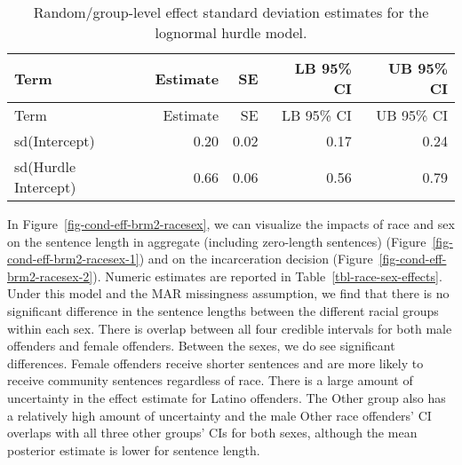 \documentclass[
  letterpaper,
  DIV=11,
  numbers=noendperiod]{scrartcl}
\begin{document}
\hypertarget{tbl-brms2-re}{}
\begin{longtable}[]{@{}lrrrr@{}}
\caption{\label{tbl-brms2-re}Random/group-level effect standard
deviation estimates for the lognormal hurdle model.}\tabularnewline
\toprule\noalign{}
Term & Estimate & SE & LB 95\% CI & UB 95\% CI \\
\midrule\noalign{}
\endfirsthead
\toprule\noalign{}
Term & Estimate & SE & LB 95\% CI & UB 95\% CI \\
\midrule\noalign{}
\endhead
\bottomrule\noalign{}
\endlastfoot
sd(Intercept) & 0.20 & 0.02 & 0.17 & 0.24 \\
sd(Hurdle Intercept) & 0.66 & 0.06 & 0.56 & 0.79 \\
\end{longtable}

In Figure~\ref{fig-cond-eff-brm2-racesex}, we can visualize the impacts
of race and sex on the sentence length in aggregate (including
zero-length sentences) (Figure~\ref{fig-cond-eff-brm2-racesex-1}) and on
the incarceration decision (Figure~\ref{fig-cond-eff-brm2-racesex-2}).
Numeric estimates are reported in Table~\ref{tbl-race-sex-effects}.
Under this model and the MAR missingness assumption, we find that there
is no significant difference in the sentence lengths between the
different racial groups within each sex. There is overlap between all
four credible intervals for both male offenders and female offenders.
Between the sexes, we do see significant differences. Female offenders
receive shorter sentences and are more likely to receive community
sentences regardless of race. There is a large amount of uncertainty in
the effect estimate for Latino offenders. The Other group also has a
relatively high amount of uncertainty and the male Other race offenders'
CI overlaps with all three other groups' CIs for both sexes, although
the mean posterior estimate is lower for sentence length.
\end{document}
